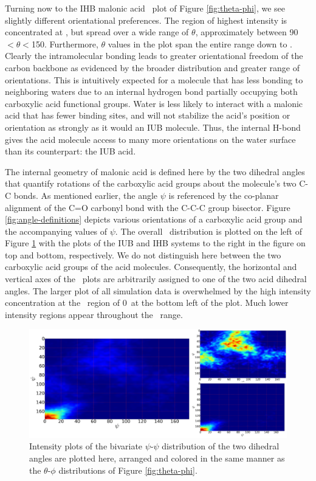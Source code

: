 Turning now to the IHB malonic acid \thetaphi~plot of Figure \ref{fig:theta-phi}, we see slightly different orientational preferences. The region of highest intensity is concentrated at \degr, but spread over a wide range of $\theta$, approximately between 90\degr $< \theta <$150\degr. Furthermore, $\theta$ values in the plot span the entire range down to \degr. Clearly the intramolecular bonding leads to greater orientational freedom of the carbon backbone as evidenced by the broader distribution and greater range of orientations. This is intuitively expected for a molecule that has less bonding to neighboring waters due to an internal hydrogen bond partially occupying both carboxylic acid functional groups. Water is less likely to interact with a malonic acid that has fewer binding sites, and will not stabilize the acid's position or orientation as strongly as it would an IUB molecule. Thus, the internal H-bond gives the acid molecule access to many more orientations on the water surface than its counterpart: the IUB acid.

The internal geometry of malonic acid is defined here by the two dihedral angles that quantify rotations of the carboxylic acid groups about the molecule's two C-C bonds. As mentioned earlier, the angle $\psi$ is referenced by the co-planar alignment of the C=O carbonyl bond with the C-C-C group bisector. Figure \ref{fig:angle-definitions} depicts various orientations of a carboxylic acid group and the accompanying values of $\psi$. The overall \psipsi~distribution is plotted on the left of Figure \ref{fig:psi-psi} with the plots of the IUB and IHB systems to the right in the figure on top and bottom, respectively. We do not distinguish here between the two carboxylic acid groups of the acid molecules. Consequently, the horizontal and vertical axes of the \psipsi~plots are arbitrarily assigned to one of the two acid dihedral angles. The larger plot of all simulation data is overwhelmed by the high intensity concentration at the \psipsi~region of 0\degr~at the bottom left of the plot. Much lower intensity regions appear throughout the \psipsi~range.


\begin{figure}[h!]
	\begin{center}
		\includegraphics[scale=1.0]{images/orientation/psi-psi.png}
		\caption{Intensity plots of the bivariate $\psi$-$\psi$ distribution of the two dihedral angles are plotted here, arranged and colored in the same manner as the $\theta$-$\phi$ distributions of Figure \ref{fig:theta-phi}.} 
		\label{fig:psi-psi}
	\end{center}
\end{figure}

